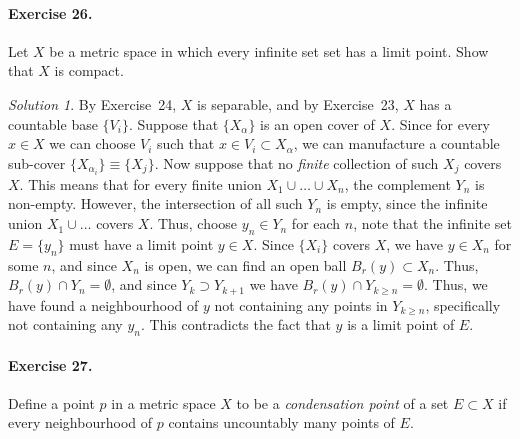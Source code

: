 \documentclass[11pt]{report}
\theoremstyle{remark}
\newtheorem*{solution}{Solution}
\begin{document}
    \paragraph{Exercise 26.} Let $X$ be a metric space in which every infinite set
    set has a limit point. Show that $X$ is compact.
    \begin{solution}
        By Exercise~24, $X$ is separable, and by Exercise~23, $X$ has a countable
        base $\{V_i\}$. Suppose that $\{X_\alpha\}$ is an open cover of $X$. Since
        for every $x \in X$ we can choose $V_i$ such that $x \in V_i \subset
        X_\alpha$, we can manufacture a countable sub-cover $\{X_{\alpha_i}\} \equiv
        \{X_j\}$. Now suppose that no \textit{finite} collection of such $X_j$
        covers $X$. This means that for every finite union $X_1 \cup \dots \cup
        X_n$, the complement $Y_n$ is non-empty. However, the intersection of all
        such $Y_n$ is empty, since the infinite union $X_1 \cup \dots$ covers $X$.
        Thus, choose $y_n \in Y_n$ for each $n$, note that the infinite set $E =
        \{y_n\}$ must have a limit point $y \in X$. Since $\{X_i\}$ covers $X$, we
        have $y \in X_n$ for some $n$, and since $X_n$ is
        open, we can find an open ball $B_r(y) \subset X_n$. Thus, $B_r(y) \cap Y_n
        = \emptyset$, and since $Y_{k} \supset Y_{k + 1}$ we have $B_r(y) \cap
        Y_{k\geq n} = \emptyset$. Thus, we have found a neighbourhood of $y$ not
        containing any points in $Y_{k \geq n}$, specifically not containing any
        $y_n$. This contradicts the fact that $y$ is a limit point of $E$.
    \end{solution}
    
    \paragraph{Exercise 27.} Define a point $p$ in a metric space $X$ to be a
    \textit{condensation point} of a set $E \subset X$ if every neighbourhood of $p$
    contains uncountably many points of $E$.
\end{document}
